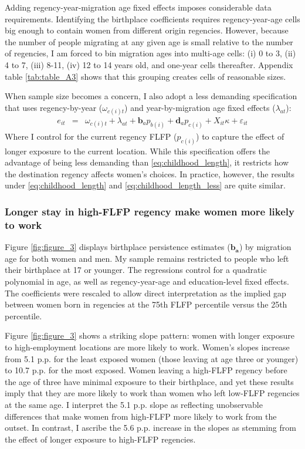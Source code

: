 Adding regency-year-migration age fixed effects imposes considerable data requirements. Identifying the birthplace coefficients requires regency-year-age cells big enough to contain women from different origin regencies. However, because the number of people migrating at any given age is small relative to the number of regencies, I am forced to bin migration ages into multi-age cells: (i) 0 to 3, (ii) 4 to 7, (iii) 8-11, (iv) 12 to 14 years old, and one-year cells thereafter. Appendix table \ref{tab:table_A3} shows that this grouping creates cells of reasonable sizes.

When sample size becomes a concern, I also adopt a less demanding specification that uses regency-by-year ($\omega_{c(i)t}$) and year-by-migration age fixed effects ($\lambda_{at}$):
\begin{eqnarray}
	\label{eq:childhood_length_less}
	e_{it}&=&\omega_{c(i)t}+\lambda_{at}+\boldsymbol b_a p_{b(i)} +\boldsymbol d_a p_{c(i)}+X_{it}\kappa+\varepsilon_{it}
\end{eqnarray}
Where I control for the current regency FLFP ($p_{c(i)}$) to capture the effect of longer exposure to the current location. While this specification offers the advantage of being less demanding than \eqref{eq:childhood_length}, it restricts how the destination regency affects women's choices. In practice, however, the results under  \eqref{eq:childhood_length}
and  \eqref{eq:childhood_length_less} are quite similar.


\subsubsection{Longer stay in high-FLFP regency make women more likely to work}

Figure \ref{fig:figure_3} displays birthplace persistence estimates ($\boldsymbol{b_{a}}$)  by migration age for both women and men. My sample remains restricted to people who left their birthplace at 17 or younger. The regressions control for a quadratic polynomial in age, as well as regency-year-age and education-level fixed effects. The coefficients were rescaled to allow direct interpretation as the implied gap between women born in regencies at the 75th FLFP percentile versus the 25th percentile.



Figure \ref{fig:figure_3} shows a striking slope pattern: women with longer exposure to high-employment locations are more likely to work. Women's slopes increase from 5.1 p.p. for the least exposed women (those leaving at age three or younger) to 10.7 p.p. for the most exposed. Women leaving a high-FLFP regency before the age of three have minimal exposure to their birthplace, and yet these results imply that they are more likely to work than women who left low-FLFP regencies at the same age. I interpret the 5.1 p.p. slope as reflecting unobservable differences that make women from high-FLFP more likely to work from the outset. In contrast, I ascribe the 5.6 p.p. increase in the slopes as stemming from the effect of longer exposure to high-FLFP regencies.


